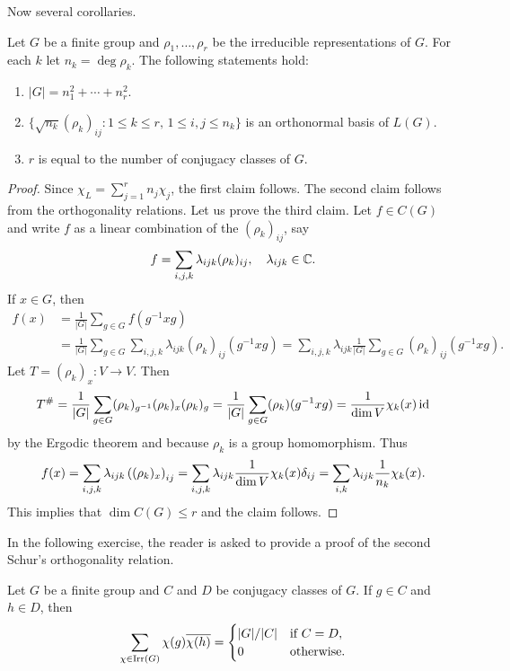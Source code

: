 Now several corollaries. 

\begin{corollary}
    Let $G$ be a finite group and $\rho_1,\dots,\rho_r$ be the irreducible representations of $G$. 
    For each $k$ let $n_k=\deg\rho_k$. The following statements hold:
    \begin{enumerate}
        \item $|G|=n_1^2+\cdots+n_r^2$.
        \item $\{\sqrt{n_k}(\rho_k)_{ij}:1\leq k\leq r,\,1\leq i,j\leq n_k\}$
            is an orthonormal basis of $L(G)$. 
        \item $r$ is equal to the number of conjugacy classes of $G$. 
    \end{enumerate}
\end{corollary}

\begin{proof}
    Since $\chi_L=\sum_{j=1}^rn_j\chi_j$, the first claim follows. 
    The second claim follows from the orthogonality relations. Let us prove the third claim. Let $f\in C(G)$ and write $f$ 
    as a linear combination of the $(\rho_k)_{ij}$, say
    \[
    f=\sum_{i,j,k}\lambda_{ijk}(\rho_k)_{ij},\quad\lambda_{ijk}\in\mathbb{C}.
    \]
    If $x\in G$, then 
    \begin{align*}
    f(x)&=\frac{1}{|G|}\sum_{g\in G}f(g^{-1}xg)\\
    &=\frac{1}{|G|}\sum_{g\in G}\sum_{i,j,k}\lambda_{ijk}(\rho_k)_{ij}(g^{-1}xg)
    =\sum_{i,j,k}\lambda_{ijk} \frac{1}{|G|}\sum_{g\in G}(\rho_k)_{ij}(g^{-1}xg). 
    \end{align*}
    Let $T=(\rho_k)_x\colon V\to V$. Then
    \[
    T^{\#}=\frac{1}{|G|}\sum_{g\in G}(\rho_k)_{g^{-1}}(\rho_k)_x(\rho_k)_g
    =\frac{1}{|G|}\sum_{g\in G}(\rho_k)(g^{-1}xg)
    =\frac{1}{\dim V}\chi_k(x)\operatorname{id}
    \]
    by the Ergodic theorem and because 
    $\rho_k$ is a group homomorphism. Thus 
    \[
    f(x)=\sum_{i,j,k}\lambda_{ijk} \left((\rho_k)_x\right)_{ij}
    =\sum_{i,j,k}\lambda_{ijk}\frac{1}{\dim V}\chi_k(x)\delta_{ij}
    =\sum_{i,k}\lambda_{ijk}\frac{1}{n_k}\chi_k(x).\qedhere 
    \]
    This implies that $\dim C(G)\leq r$ and the claim follows. 
\end{proof}

In the following exercise, the reader is asked to provide a proof of the second 
Schur's orthogonality relation. 

\begin{exercise}
    Let $G$ be a finite group and 
    $C$ and $D$ be conjugacy classes of $G$. If $g\in C$ and $h\in D$, then
    \[
    \sum_{\chi\in\operatorname{Irr}(G)}\chi(g)\overline{\chi(h)}=
    \begin{cases}
    |G|/|C| & \text{if $C=D$},\\
    0 & \text{otherwise}.
    \end{cases}
    \]
\end{exercise}
